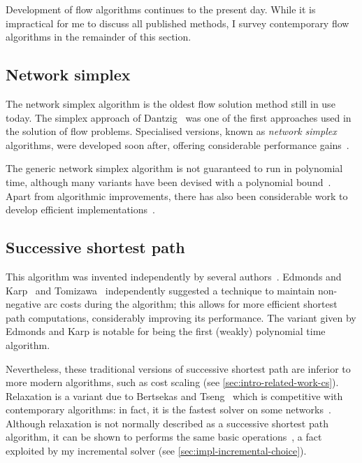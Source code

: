 Development of flow algorithms continues to the present day. While it is impractical for me to discuss all published methods, I survey contemporary flow algorithms in the remainder of this section.

\subsection{Network simplex}

The network simplex algorithm is the oldest flow solution method still in use today. The simplex approach of Dantzig~\cite{Dantzig:1949} was one of the first approaches used in the solution of flow problems. Specialised versions, known as \emph{network simplex} algorithms, were developed soon after, offering considerable performance gains~\cite{Dantzig:1962}.

The generic network simplex algorithm is not guaranteed to run in polynomial time\footnotemark, although many variants have been devised with a polynomial bound~\cite{Tarjan:1991,Goldfarb:1992}. Apart from algorithmic improvements, there has also been considerable work to develop efficient implementations~\cite{Lobel:1996,Grigoriadis:1986}.

\subsection{Successive shortest path} \label{sec:intro-related-work-ssp}

This algorithm was invented independently by several authors~\cite{Jewell:1958,Iri:1960,BusackerGowen:1960}. Edmonds and Karp~\cite{Edmonds:1972} and Tomizawa~\cite{Tomizawa:1971} independently suggested a technique to maintain non-negative arc costs during the algorithm; this allows for more efficient shortest path computations, considerably improving its performance. The variant given by Edmonds and Karp is notable for being the first (weakly) polynomial time algorithm\footnotemark.

Nevertheless, these traditional versions of successive shortest path are inferior to more modern algorithms, such as cost scaling (see \cref{sec:intro-related-work-cs}). Relaxation is a variant due to Bertsekas and Tseng~\cite{BertsekasMethod:1988,BertsekasCodes:1988,BertsekasTseng:94} which is competitive with contemporary algorithms: in fact, it is the fastest solver on some networks~\cite{KiralyKovacs:2012}. Although relaxation is not normally described as a successive shortest path algorithm, it can be shown to performs the same basic operations~\cite[\S9.10]{Ahuja:1993}, a fact exploited by my incremental solver (see \cref{sec:impl-incremental-choice}). 

